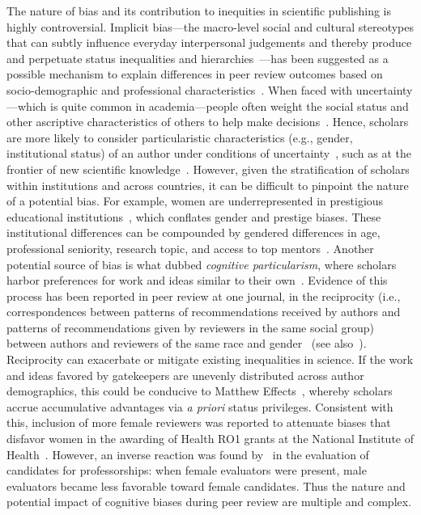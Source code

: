 \documentclass[10pt,letterpaper]{article}
\begin{document}
The nature of bias and its contribution to inequities in scientific publishing is highly controversial. Implicit bias—the macro-level social and cultural stereotypes that can subtly influence everyday interpersonal judgements and thereby produce and perpetuate status inequalities and hierarchies~\cite{berger_status_1977, correll_expectation_2006}—has been suggested as a possible mechanism to explain differences in peer review outcomes based on socio-demographic and professional characteristics~\cite{lee_bias_2013, budden_double-blind_2008}. When faced with uncertainty—which is quite common in academia—people often weight the social status and other ascriptive characteristics of others to help make decisions~\cite{podolny_status_2008}. Hence, scholars are more likely to consider particularistic characteristics (e.g., gender, institutional status) of an author under conditions of uncertainty~\cite{long_scientific_1995, pfeffer_paradigm_1977}, such as at the frontier of new scientific knowledge~\cite{cole_hierarchy_1983}. However, given the stratification of scholars within institutions and across countries, it can be difficult to pinpoint the nature of a potential bias. For example, women are underrepresented in prestigious educational institutions~\cite{clauset_systematic_2015, jacobs_gender_1999,weeden_degrees_2017}, which conflates gender and prestige biases. These institutional differences can be compounded by gendered differences in age, professional seniority, research topic, and access to top mentors~\cite{sheltzer_elite_2014}. Another potential source of bias is what \cite{travis_new_1991} dubbed \textit{cognitive particularism}, where scholars harbor preferences for work and ideas similar to their own~\cite{teplitskiy_sociology_2018}. Evidence of this process has been reported in peer review at one journal, in the reciprocity (i.e., correspondences between patterns of recommendations received by authors and patterns of recommendations given by reviewers in the same social group) between authors and reviewers of the same race and gender~\cite{demarest_reviewer_2014} (see also~\cite{link_us_1998,helmer_research:_2017}). Reciprocity can exacerbate or mitigate existing inequalities in science. If the work and ideas favored by gatekeepers are unevenly distributed across author demographics, this could be conducive to Matthew Effects~\cite{merton_matthew_1968}, whereby scholars accrue accumulative advantages via \textit{a priori} status privileges. Consistent with this, inclusion of more female reviewers was reported to attenuate biases that disfavor women in the awarding of Health RO1 grants at the National Institute of Health~\cite{li_gender_2011}. However, an inverse reaction was found by~\cite{bagues_does_2017} in the evaluation of candidates for professorships: when female evaluators were present, male evaluators became less favorable toward female candidates. Thus the nature and potential impact of cognitive biases during peer review are multiple and complex. 
\end{document}

